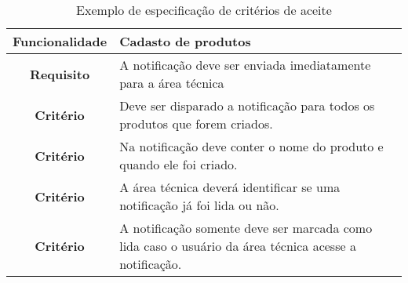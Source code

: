       \begin{table}[h!]
        \centering
        \begin{tabular}{|c|p{10cm}|}
          \hline
          \textbf{Funcionalidade} &
          Cadasto de produtos \\ \hline
          \textbf{Requisito} &
          A notificação deve ser enviada imediatamente para a área técnica \\ \hline
          \textbf{Critério} &
          Deve ser disparado a notificação para todos os produtos que forem criados. \\ \hline
          \textbf{Critério} &
          Na notificação deve conter o nome do produto e quando ele foi criado. \\ \hline
          \textbf{Critério} &
          A área técnica deverá identificar se uma notificação já foi lida ou não. \\ \hline
          \textbf{Critério} &
          A notificação somente deve ser marcada como lida caso o usuário da área
          técnica acesse a notificação. \\ \hline
        \end{tabular}
        \caption{Exemplo de especificação de critérios de aceite}
        \label{Tabela:8}
      \end{table}

